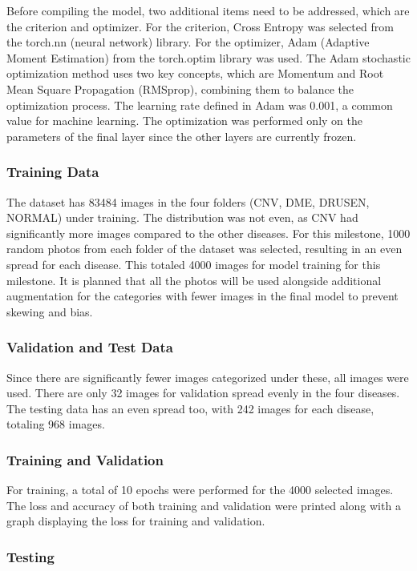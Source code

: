 \documentclass[11pt]{article}
\begin{document}
Before compiling the model, two additional items need to be addressed, which are the criterion and optimizer. For the criterion, Cross Entropy was selected from the torch.nn (neural network) library. For the optimizer, Adam (Adaptive Moment Estimation) from the torch.optim library was used. The Adam stochastic optimization method uses two key concepts, which are Momentum and Root Mean Square Propagation (RMSprop), combining them to balance the optimization process. The learning rate defined in Adam was 0.001, a common value for machine learning. The optimization was performed only on the parameters of the final layer since the other layers are currently frozen.

\subsubsection{Training Data}

The dataset has 83484 images in the four folders (CNV, DME, DRUSEN, NORMAL) under training. The distribution was not even, as CNV had significantly more images compared to the other diseases. For this milestone, 1000 random photos from each folder of the dataset was selected, resulting in an even spread for each disease. This totaled 4000 images for model training for this milestone. It is planned that all the photos will be used alongside additional augmentation for the categories with fewer images in the final model to prevent skewing and bias.

\subsubsection{Validation and Test Data}

Since there are significantly fewer images categorized under these, all images were used. There are only 32 images for validation spread evenly in the four diseases. The testing data has an even spread too, with 242 images for each disease, totaling 968 images.

\subsubsection{Training and Validation}

For training, a total of 10 epochs were performed for the 4000 selected images. The loss and accuracy of both training and validation were printed along with a graph displaying the loss for training and validation.

\subsubsection{Testing}
\end{document}
